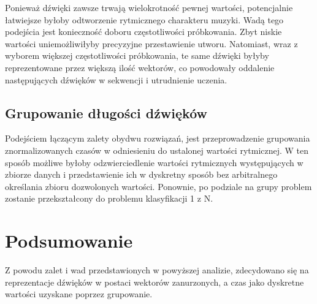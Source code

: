 {{{            Ponieważ dźwięki zawsze trwają wielokrotność pewnej wartości, potencjalnie łatwiejsze byłoby 
            odtworzenie rytmicznego charakteru muzyki.
            Wadą tego podejścia jest konieczność doboru częstotliwości próbkowania. Zbyt niskie wartości 
            uniemożliwiłyby precyzyjne przestawienie utworu. Natomiast, wraz z wyborem większej częstotliwości próbkowania,
            te same dźwięki byłyby reprezentowane przez większą ilość wektorów, 
            co powodowały oddalenie następujących dźwięków w sekwencji i utrudnienie uczenia.
        }

        \subsection{Grupowanie długości dźwięków}
        {
            Podejściem łączącym zalety obydwu rozwiązań, jest przeprowadzenie grupowania znormalizowanych czasów w
            odniesieniu do ustalonej wartości rytmicznej. W ten sposób możliwe byłoby odzwierciedlenie wartości rytmicznych
            występujących w zbiorze danych i przedstawienie ich w dyskretny sposób bez arbitralnego określania zbioru dozwolonych
            wartości. 
            Ponownie, po podziale na grupy problem zostanie przekształcony do problemu klasyfikacji 1 z N.
        }
    }

    \section{Podsumowanie}
    {
        Z powodu zalet i wad przedstawionych w powyższej analizie, zdecydowano się na reprezentacje dźwięków w postaci
        wektorów zanurzonych, a czas jako dyskretne wartości uzyskane poprzez grupowanie.
    }
}